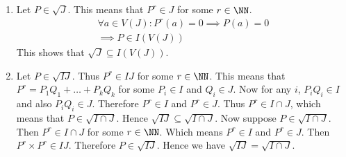 \begin{enumerate}[label=\ilabel]
    \item 
        Let $P \in \sqrt{J}$. This means that $P^r \in J$ for some $r \in \NN$. 
        \begin{gather*}
            \forall a \in V(J): P^r(a) = 0 \implies P(a) = 0 \\
            \implies P \in I(V(J))
        \end{gather*}
        This shows that $\sqrt{J} \subseteq I(V(J))$. 
        
    \item
        Let $P \in \sqrt{IJ}$. Thus $P^r \in IJ$ for some $r \in \NN$. This means that $P^r = P_1 Q_1 + \dots + P_k Q_k$ for some $P_i \in I$ and $Q_i \in J$. Now for any $i$, $P_i Q_i \in I$ and also $P_i Q_i \in J$. Therefore $P^r \in I$ and $P^r \in J$. Thus $P^r \in I \cap J$, which means that $P \in \sqrt{I \cap J}$. Hence $\sqrt{IJ} \subseteq \sqrt{I \cap J}$. Now suppose $P \in \sqrt{I \cap J}$. Then $P^r \in I \cap J$ for some $r \in \NN$. Which means $P^r \in I$ and $P^r \in J$. Then $P^r \times P^r \in IJ$. Therefore $P \in \sqrt{IJ}$. Hence we have $\sqrt{IJ} = \sqrt{I \cap J}$.
\end{enumerate}